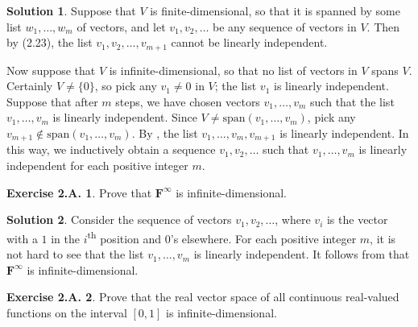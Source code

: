 \documentclass[12pt]{article}
\theoremstyle{definition}
\theoremstyle{exercise}
\newtheorem{exercise}{Exercise 2.A.}
\theoremstyle{solution}
\newtheorem*{solution}{Solution}
\newcommand{\ts}{\textsuperscript}
\newcommand{\Span}{\text{span}}
\newcommand{\F}{\mathbf{F}}
\begin{document}
\begin{solution}
    Suppose that \( V \) is finite-dimensional, so that it is spanned by some list \( w_1, \ldots, w_m \) of vectors, and let \( v_1, v_2, \ldots \) be any sequence of vectors in \( V \). Then by (2.23), the list \( v_1, v_2, \ldots, v_{m+1} \) cannot be linearly independent.
    
    Now suppose that \( V \) is infinite-dimensional, so that no list of vectors in \( V \) spans \( V \). Certainly \( V \neq \{ 0 \} \), so pick any \( v_1 \neq 0 \) in \( V \); the list \( v_1 \) is linearly independent. Suppose that after \( m \) steps, we have chosen vectors \( v_1, \ldots, v_m \) such that the list \( v_1, \ldots, v_m \) is linearly independent. Since \( V \neq \Span (v_1, \ldots, v_m) \), pick any \( v_{m+1} \not\in \Span (v_1, \ldots, v_m) \). By , the list \( v_1, \ldots, v_m, v_{m+1} \) is linearly independent. In this way, we inductively obtain a sequence \( v_1, v_2, \ldots \) such that \( v_1, \ldots, v_m \) is linearly independent for each positive integer \( m \).
\end{solution}

\begin{exercise}
\label{ex:15}
    Prove that \( \F^{\infty} \) is infinite-dimensional.
\end{exercise}

\begin{solution}
    Consider the sequence of vectors \( v_1, v_2, \ldots \), where \( v_i \) is the vector with a \( 1 \) in the \( i \)\ts{th} position and \( 0 \)'s elsewhere. For each positive integer \( m \), it is not hard to see that the list \( v_1, \ldots, v_m \) is linearly independent. It follows from  that \( \F^{\infty} \) is infinite-dimensional.
\end{solution}

\begin{exercise}
\label{ex:16}
    Prove that the real vector space of all continuous real-valued functions on the interval \( [0, 1] \) is infinite-dimensional.
\end{exercise}
\end{document}
